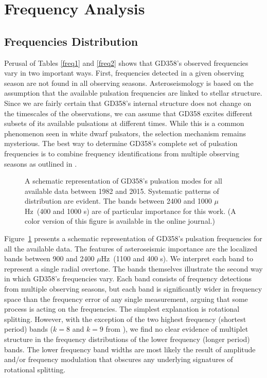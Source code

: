 \documentclass[12pt,preprint]{aastex}
\newcommand{\muHz}{\mbox{$\mu$Hz}}
\begin{document}
\section{Frequency Analysis}\label{analysis}

\subsection{Frequencies Distribution}

Perusal of Tables \ref{freq1} and \ref{freq2} shows that GD358's observed frequencies vary in two
important ways.  First, frequencies detected in a given observing season are not found 
in all observing seasons. Asteroseismology is based on the assumption that the available pulsation
frequencies are linked to stellar structure.  Since we are fairly certain that GD358's internal structure 
does not change on the timescales of the observations, we can assume that GD358 excites 
different subsets of its available pulsations at different times. While this is a common phenomenon
seen in white dwarf pulsators, the selection mechanism remains mysterious. The best way to 
determine GD358's complete set of pulsation frequencies is to combine frequency identifications 
from multiple observing seasons as outlined in \citet{Kleinman98}.  

\begin{figure}
\caption{A schematic representation of GD358's pulsation modes for all available data between
1982 and 2015. Systematic patterns of distribution are evident. The bands between 2400 and 1000
\muHz\ (400 and 1000 s) are of particular importance for this work. (A color version of this 
figure is available in the online journal.)
\label{schematic}
}
\end{figure}

Figure~\ref{schematic} presents a schematic representation of GD358's pulsation frequencies for all the 
available data. The features of asteroseismic importance are the localized bands between 900 and 2400
\muHz\ (1100 and 400 s). We interpret each band to represent a single radial overtone. The bands
themselves illustrate the second way in which GD358's frequencies vary. Each band consists of 
frequency detections from multiple observing seasons, but each band is significantly wider in 
frequency space than the frequency error of any single measurement, arguing that some process 
is acting on the frequencies. The simplest explanation is rotational splitting.  However, with the 
exception of the two highest frequency (shortest period) bands ($k=8$ and $k=9$ 
from \citet{Provencal09}), we find no clear evidence of multiplet structure in the frequency 
distributions of the lower frequency (longer period) bands. The lower frequency band widths are 
most likely the result of amplitude and/or frequency modulation that obscures any underlying 
signatures of rotational splitting.  
\end{document}
